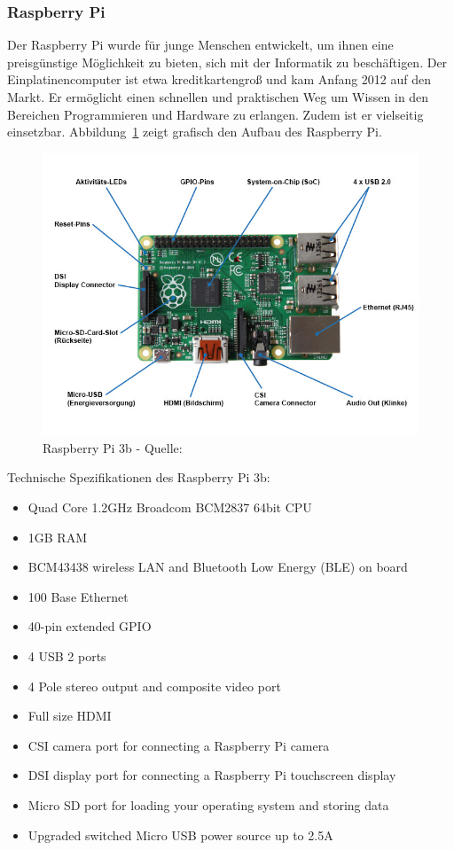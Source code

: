 \documentclass[a4paper,11pt,singlespacing]{article}
\begin{document}
    		\subsubsection{Raspberry Pi}
    			Der Raspberry Pi wurde für junge Menschen entwickelt, um ihnen eine preisgünstige Möglichkeit zu bieten, sich mit der Informatik zu beschäftigen. Der Einplatinencomputer ist etwa kreditkartengroß und kam Anfang 2012 auf den Markt. Er ermöglicht einen schnellen und praktischen Weg um Wissen in den Bereichen Programmieren und Hardware zu erlangen. Zudem ist er vielseitig einsetzbar. Abbildung~\ref{raspberrypi3b} zeigt grafisch den Aufbau des Raspberry Pi.
    			\begin{figure}[H]
    				\centering
	    			\includegraphics[scale=0.5]{raspberry_pi_3b}
	    				\caption{Raspberry Pi 3b - Quelle: \cite{Picture_Raspberrypi3b} }
	    				\label{raspberrypi3b}
				\end{figure}
				Technische Spezifikationen des Raspberry Pi 3b:
				\begin{itemize}
					\item Quad Core 1.2GHz Broadcom BCM2837 64bit CPU
					\item 1GB RAM
					\item BCM43438 wireless LAN and Bluetooth Low Energy (BLE) on board
					\item 100 Base Ethernet
					\item 40-pin extended GPIO
					\item 4 USB 2 ports
					\item 4 Pole stereo output and composite video port
					\item Full size HDMI
					\item CSI camera port for connecting a Raspberry Pi camera
					\item DSI display port for connecting a Raspberry Pi touchscreen display
					\item Micro SD port for loading your operating system and storing data
					\item Upgraded switched Micro USB power source up to 2.5A  \cite{Quote_Raspberrypi3b}
				\end{itemize}
\end{document}
